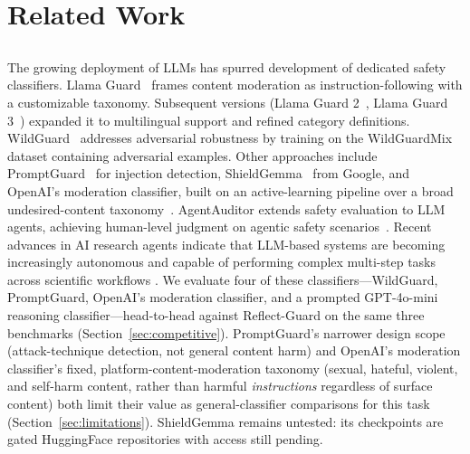 \documentclass[superintelligence,article,accept,moreauthors]{Definitions/mdpi}
\begin{document}
\section{Related Work}

\subsection{
}
The growing deployment of LLMs has spurred development of dedicated safety classifiers. Llama Guard~\citep{inan2023llamaguard} frames content moderation as instruction-following with a customizable taxonomy. Subsequent versions (Llama Guard 2~\citep{metallamaguard2}, Llama Guard 3~\citep{metallamaguard3}) expanded it to multilingual support and refined category definitions. WildGuard~\citep{han2024wildguard} addresses adversarial robustness by training on the WildGuardMix dataset containing adversarial examples. Other approaches include PromptGuard~\citep{meta2024promptguard} for injection detection, ShieldGemma~\citep{zeng2024shieldgemma} from Google, and OpenAI's moderation classifier, built on an active-learning pipeline over a broad undesired-content taxonomy~\citep{markov2023holistic}. AgentAuditor extends safety evaluation to LLM agents, achieving human-level judgment on agentic safety \mbox{scenarios~\citep{luo2025agentauditor}.} Recent advances in AI research agents indicate that LLM-based systems are becoming increasingly autonomous and capable of performing complex multi-step tasks across scientific workflows \citep{kong2026aiautoresearch}. We evaluate four of these classifiers---WildGuard, PromptGuard, OpenAI's moderation classifier, and a prompted GPT-4o-mini reasoning classifier---head-to-head against Reflect-Guard on the same three benchmarks (Section~\ref{sec:competitive}). PromptGuard's narrower design scope (attack-technique detection, not general content harm) and OpenAI's moderation classifier's fixed, platform-content-moderation taxonomy (sexual, hateful, violent, and self-harm content, rather than harmful \emph{instructions} regardless of surface content) both limit their value as general-classifier comparisons for this task (Section~\ref{sec:limitations}). ShieldGemma remains untested: its checkpoints are gated HuggingFace repositories with access still pending.
\end{document}
